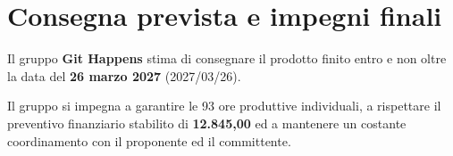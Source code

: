 \section {Consegna prevista e impegni finali}
Il gruppo \textbf{Git Happens} stima di consegnare il prodotto finito entro e non oltre la data del \textbf{26 marzo 2027} (2027/03/26).

Il gruppo si impegna a garantire le 93 ore produttive individuali, a rispettare il preventivo finanziario stabilito di \textbf{\texteuro{} 12.845,00} ed a mantenere un costante coordinamento con il proponente ed il committente.
